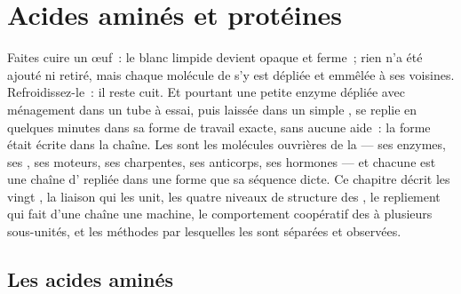 \chapter{Acides aminés et protéines}\label{ch:b1:proteins}

Faites cuire un œuf~: le blanc limpide devient opaque et ferme~; rien
n'a été ajouté ni retiré, mais chaque molécule de  s'y est
dépliée et emmêlée à ses voisines. Refroidissez-le~: il reste cuit. Et
pourtant une petite enzyme dépliée avec ménagement dans un tube à essai,
puis laissée dans un simple , se replie en quelques minutes dans
sa forme de travail exacte, sans aucune aide~: la forme était écrite
dans la chaîne. Les  sont les molécules ouvrières de la 
--- ses enzymes, ses , ses moteurs, ses charpentes, ses anticorps,
ses hormones --- et chacune est une chaîne d' repliée dans
une forme que sa séquence dicte. Ce chapitre décrit les vingt , la liaison qui les unit, les quatre niveaux de structure des
, le repliement qui fait d'une chaîne une machine, le
comportement coopératif des  à plusieurs sous-unités, et les
méthodes par lesquelles les  sont séparées et observées.

\section{Les acides aminés}

